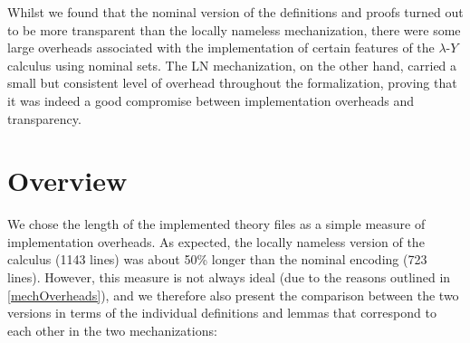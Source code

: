 \documentclass[a4paper, 12pt, twoside]{style/ociamthesis}
\theoremstyle{plain}
\theoremstyle{definition}
\theoremstyle{remark}
\newcommand{\lamy}{\lambda\text{-}Y}
\begin{document}
Whilst we found that the nominal version of the definitions and proofs
turned out to be more transparent than the locally nameless
mechanization, there were some large overheads associated with the
implementation of certain features of the \(\lamy\) calculus using
nominal sets. The LN mechanization, on the other hand, carried a small
but consistent level of overhead throughout the formalization, proving
that it was indeed a good compromise between implementation overheads
and transparency.

\section{Overview}\label{overview-1}

We chose the length of the implemented theory files as a simple measure
of implementation overheads. As expected, the locally nameless version
of the calculus (1143 lines) was about 50\% longer than the nominal
encoding (723 lines). However, this measure is not always ideal (due to
the reasons outlined in \cref{mechOverheads}), and we therefore also
present the comparison between the two versions in terms of the
individual definitions and lemmas that correspond to each other in the
two mechanizations:

\newcommand{\lem}[1]{\bf{lemma}\ \it{#1}}
\newcommand{\fun}[1]{\bf{fun}\ \it{#1}}
\newcommand{\nfun}[1]{\bf{nominal\_function}\ \it{#1}}
\newcommand{\dat}[1]{\bf{datatype}\ \it{#1}}
\newcommand{\ndat}[1]{\bf{nominal\_datatype}\ \it{#1}}
\newcommand{\induct}[1]{\bf{inductive}\ \it{#1}}
\end{document}
